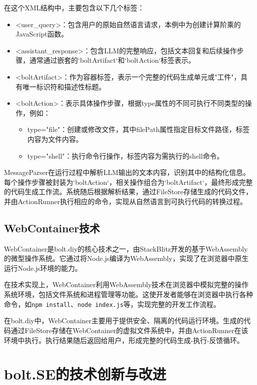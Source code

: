 在这个XML结构中，主要包含以下几个标签：

\begin{itemize}
    \item \textless user\_query\textgreater：包含用户的原始自然语言请求，本例中为创建计算阶乘的JavaScript函数。
    \item \textless assistant\_response\textgreater：包含LLM的完整响应，包括文本回复和后续操作步骤，通常通过嵌套的`boltArtifact`和`boltAction`标签表示。
    \item \textless boltArtifact\textgreater：作为容器标签，表示一个完整的代码生成单元或"工件"，具有唯一标识符和描述性标题。
    \item \textless boltAction\textgreater：表示具体操作步骤，根据type属性的不同可执行不同类型的操作，例如：
    \begin{itemize}
        \item type="file"：创建或修改文件，其中filePath属性指定目标文件路径，标签内容为文件内容。
        \item type="shell"：执行命令行操作，标签内容为需执行的shell命令。
    \end{itemize}
\end{itemize}

MessageParser在运行过程中解析LLM输出的文本内容，识别其中的结构化信息。每个操作步骤被封装为`boltAction`，相关操作组合为`boltArtifact`，最终形成完整的代码生成工作流。系统随后根据解析结果，通过FileStore存储生成的代码文件，并由ActionRunner执行相应的命令，实现从自然语言到可执行代码的转换过程。

\subsection{WebContainer技术}

WebContainer是bolt.diy的核心技术之一，由StackBlitz开发的基于WebAssembly的微型操作系统。它通过将Node.js编译为WebAssembly，实现了在浏览器中原生运行Node.js环境的能力。

在技术实现上，WebContainer利用WebAssembly技术在浏览器中模拟完整的操作系统环境，包括文件系统和进程管理等功能。这使开发者能够在浏览器中执行各种命令，如\texttt{npm install}、\texttt{node index.js}等，实现完整的开发工作流程。

在bolt.diy中，WebContainer主要用于提供安全、隔离的代码运行环境。生成的代码通过FileStore存储在WebContainer的虚拟文件系统中，并由ActionRunner在该环境中执行。执行结果随后返回给用户，形成完整的代码生成-执行-反馈循环。

\section{bolt.SE的技术创新与改进}

